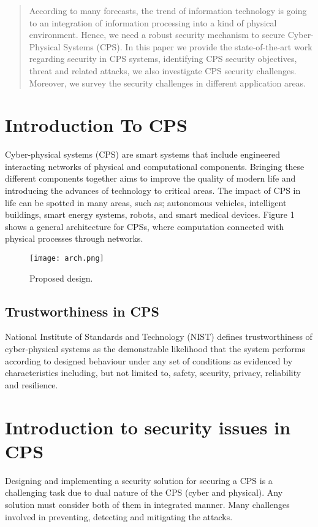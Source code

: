 
\begin{abstract}
 According to many forecasts, the trend of information technology is going to an integration of information processing into a kind of physical environment. Hence, we need a robust security mechanism to secure Cyber-Physical Systems (CPS). In this paper we provide the state-of-the-art work regarding security in CPS systems, identifying CPS security objectives, threat and related attacks, we also investigate CPS security challenges. Moreover, we survey the security challenges in different application areas.
\end{abstract}
\section{Introduction To CPS}
Cyber-physical systems (CPS) are smart systems that include engineered interacting networks of physical and computational components. Bringing these different components together aims to improve the quality of modern life and introducing the advances of technology to critical areas. The impact of CPS in life can be spotted in many areas, such as; autonomous vehicles, intelligent buildings, smart energy systems, robots, and smart medical devices. Figure 1 shows a general architecture for CPSs, where computation connected with physical processes through networks.

\begin{figure}[h!]
  \texttt{[image: arch.png]}
  \caption{Proposed design.}
  \label{fig:design}
\end{figure} 

\subsection{Trustworthiness in CPS}
National Institute of Standards and Technology (NIST) defines trustworthiness of cyber-physical systems as the demonstrable likelihood that the system performs according to designed behaviour under any set of conditions as evidenced by characteristics including, but not limited to, safety, security, privacy, reliability and resilience.

\section{Introduction to security issues in CPS}
Designing and implementing a security solution for securing a CPS is a challenging task due to dual nature of the CPS (cyber and physical). Any solution must consider both of them in integrated manner. Many challenges involved in preventing, detecting and mitigating the attacks.
